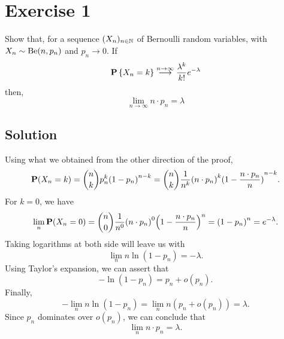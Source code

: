 \section{Exercise 1}
Show that, for a sequence $(X_n)_{n\in\N}$ of Bernoulli random variables, with $X_n \sim \Be(n,p_n)$ and $p_n \to 0$. If
\[ \P\left\{ X_n = k \right\} \overset{n\to\infty}{\longrightarrow} \frac{\lambda^k}{k!} e^{-\lambda} \]
then,
\[ \lim_{n\to\infty} n \cdot p_n = \lambda \]

\subsection*{Solution}

Using what we obtained from the other direction of the proof,
\[ \P(X_n = k) = \binom{n}{k} p_n^k {(1-p_n)}^{n-k} = \binom{n}{k} \frac{1}{n^k}{(n\cdot p_n)}^k {(1-\frac{n\cdot p_n}{n})}^{n-k}. \]
For $k = 0$, we have
\[ \lim_n \P(X_n = 0) = \binom{n}{0} \frac{1}{n^0}{(n\cdot p_n)}^0{\left( 1-\frac{n\cdot p_n}{n} \right)}^{n} = {\left( 1-p_n \right)}^n = e^{-\lambda}. \]
Taking logarithms at both side will leave us with
\[ \lim_n n \ln \left( 1-p_n \right) = -\lambda.\]
Using Taylor's expansion, we can assert that
\[ - \ln\left( 1-p_n \right) = p_n + o(p_n). \]
Finally,
\[- \lim_n n \ln \left( 1-p_n \right) = \lim_n n(p_n + o(p_n)) = \lambda.\]
Since $p_n$ dominates over $o(p_n)$, we can conclude that
\[ \lim_n n \cdot p_n = \lambda. \]